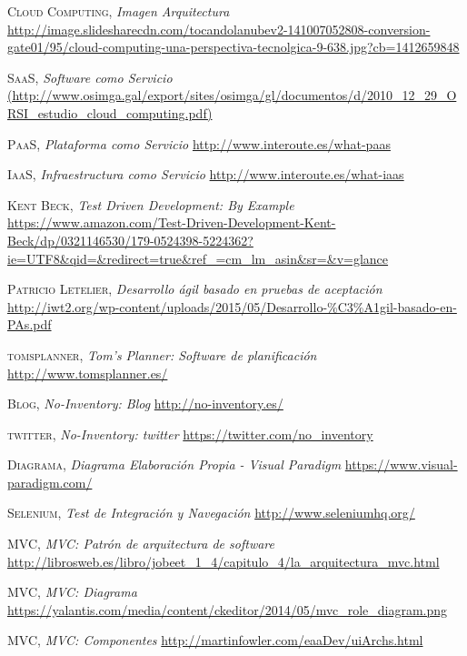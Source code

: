 \documentclass[a4paper,11pt]{book}
\begin{document}
\begin{thebibliography}{aaaa}
 \textsc{Cloud Computing},
\textit{Imagen Arquitectura}
\url{http://image.slidesharecdn.com/tocandolanubev2-141007052808-conversion-gate01/95/cloud-computing-una-perspectiva-tecnolgica-9-638.jpg?cb=1412659848}

 \textsc{SaaS},
\textit{Software como Servicio}
\url{(http://www.osimga.gal/export/sites/osimga/gl/documentos/d/2010_12_29_ORSI_estudio_cloud_computing.pdf)} 

 \textsc{PaaS},
\textit{Plataforma como Servicio}
\url{http://www.interoute.es/what-paas} 

 \textsc{IaaS},
\textit{Infraestructura como Servicio}
\url{http://www.interoute.es/what-iaas} 

 \textsc{Kent Beck},
\textit{Test Driven Development: By Example}
\url{https://www.amazon.com/Test-Driven-Development-Kent-Beck/dp/0321146530/179-0524398-5224362?ie=UTF8&qid=&redirect=true&ref_=cm_lm_asin&sr=&v=glance}


 \textsc{Patricio Letelier},
\textit{Desarrollo ágil basado en pruebas de aceptación}
\url{http://iwt2.org/wp-content/uploads/2015/05/Desarrollo-\%C3\%A1gil-basado-en-PAs.pdf}

 \textsc{tomsplanner},
\textit{Tom's Planner: Software de planificación}
\url{http://www.tomsplanner.es/}

 \textsc{Blog},
\textit{No-Inventory: Blog}
\url{http://no-inventory.es/}

 \textsc{twitter},
\textit{No-Inventory: twitter}
\url{https://twitter.com/no_inventory}

 \textsc{Diagrama},
\textit{Diagrama Elaboración Propia - Visual Paradigm}
\url{https://www.visual-paradigm.com/}




 \textsc{Selenium},
\textit{Test de Integración y Navegación}
\url{http://www.seleniumhq.org/}

 \textsc{MVC},
\textit{MVC: Patrón de arquitectura de software }
\url{http://librosweb.es/libro/jobeet_1_4/capitulo_4/la_arquitectura_mvc.html}

 \textsc{MVC},
\textit{MVC: Diagrama}
\url{https://yalantis.com/media/content/ckeditor/2014/05/mvc_role_diagram.png}

 \textsc{MVC},
\textit{MVC: Componentes}
\url{http://martinfowler.com/eaaDev/uiArchs.html}


\end{thebibliography}
\end{document}
